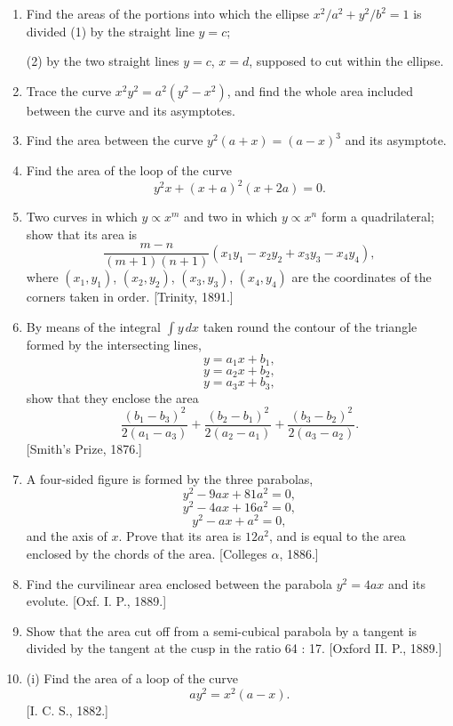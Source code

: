 \documentclass[11pt, a4paper]{article}
\newcommand{\source}[1]{\hfill\textnormal{[#1]}}
\begin{document}
\begin{enumerate}[leftmargin=2em]
In what ratio is this area divided by the common chord in each case?

\item Find the areas of the portions into which the ellipse $x^2/a^2+y^2/b^2=1$ is divided (1) by the straight line $y=c$;

(2) by the two straight lines $y=c$, $x=d$, supposed to cut within the ellipse.

\item Trace the curve $x^2y^2=a^2(y^2-x^2)$, and find the whole area included between the curve and its asymptotes.

\item Find the area between the curve $y^2(a+x)=(a-x)^3$ and its asymptote.

\item Find the area of the loop of the curve
\[
y^2x+(x+a)^2(x+2a)=0.
\]

\item Two curves in which $y\propto x^m$ and two in which $y\propto x^n$ form a quadrilateral; show that its area is
\[
\frac{m-n}{(m+1)(n+1)}(x_1y_1-x_2y_2+x_3y_3-x_4y_4),
\]
where $(x_1,y_1)$, $(x_2,y_2)$, $(x_3,y_3)$, $(x_4,y_4)$ are the coordinates of the corners taken in order. \source{Trinity, 1891.}

\item By means of the integral $\displaystyle\int y\,dx$ taken round the contour of the triangle formed by the intersecting lines,
\[
y=a_1x+b_1,
\]
\[
y=a_2x+b_2,
\]
\[
y=a_3x+b_3,
\]
show that they enclose the area
\[
\frac{(b_1-b_3)^2}{2(a_1-a_3)}+\frac{(b_2-b_1)^2}{2(a_2-a_1)}+\frac{(b_3-b_2)^2}{2(a_3-a_2)}.
\]
\source{Smith's Prize, 1876.}

\item A four-sided figure is formed by the three parabolas,
\[
y^2-9ax+81a^2=0,
\]
\[
y^2-4ax+16a^2=0,
\]
\[
y^2-ax+a^2=0,
\]
and the axis of $x$. Prove that its area is $12a^2$, and is equal to the area enclosed by the chords of the area. \source{Colleges $\alpha$, 1886.}

\item Find the curvilinear area enclosed between the parabola $y^2=4ax$ and its evolute. \source{Oxf. I. P., 1889.}

\item Show that the area cut off from a semi-cubical parabola by a tangent is divided by the tangent at the cusp in the ratio 64 : 17. \source{Oxford II. P., 1889.}

\item (i) Find the area of a loop of the curve
\[
ay^2=x^2(a-x).
\]
\source{I. C. S., 1882.}


\end{enumerate}
\end{document}
